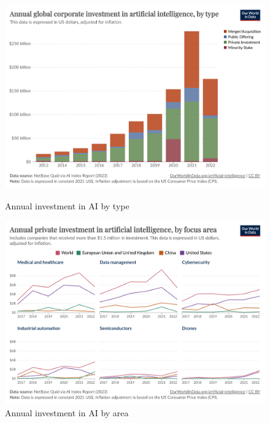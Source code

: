 \documentclass[paper=a4, fontsize=11pt]{scrartcl} %
\numberwithin{equation}{section} %
\numberwithin{figure}{section} %
\numberwithin{table}{section} %
\begin{document}
\begin{figure}[H]
    \centering
    \begin{minipage}[t]{0.48\linewidth}
        \includegraphics[width=\linewidth]{./data/investment_by_type.png}
        \caption{Annual investment in AI by type}
        \label{fig:investment}
    \end{minipage}\hfill
    \begin{minipage}[t]{0.48\linewidth}
        \includegraphics[width=\linewidth]{./data/investment_by_area.png}
        \caption{Annual investment in AI by area}
        \label{fig:views_ai_impact}
    \end{minipage}
\end{figure}
\end{document}
